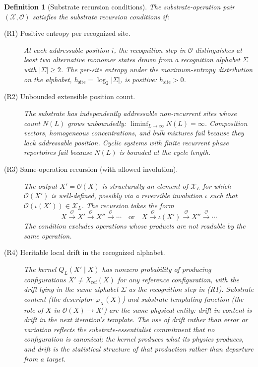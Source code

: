 \documentclass[aps,prx,reprint,amsmath,amssymb,floatfix,superscriptaddress,nofootinbib]{revtex4-2}
\theoremstyle{plain-thm}
\theoremstyle{definition-thm}
\newtheorem{definition}[theorem]{Definition}
\newcommand{\descX}{\varphi_X}
\newcommand{\Xset}{\mathcal{X}}
\newcommand{\Op}{\mathcal{O}}
\begin{document}
\begin{definition}[Substrate recursion conditions]
\label{def:conditions}
The substrate-operation pair $(\Xset, \Op)$ satisfies the substrate recursion conditions if:

\begin{description}
\item[(R1) Positive entropy per recognized site.] At each addressable position $i$, the recognition step in $\Op$ distinguishes at least two alternative monomer states drawn from a recognition alphabet $\Sigma$ with $|\Sigma| \ge 2$. The per-site entropy under the maximum-entropy distribution on the alphabet, $h_{\mathrm{site}} = \log_2 |\Sigma|$, is positive: $h_{\mathrm{site}} > 0$.

\item[(R2) Unbounded extensible position count.] The substrate has independently addressable non-recurrent sites whose count $N(L)$ grows unboundedly: $\liminf_{L \to \infty} N(L) = \infty$. Composition vectors, homogeneous concentrations, and bulk mixtures fail because they lack addressable position. Cyclic systems with finite recurrent phase repertoires fail because $N(L)$ is bounded at the cycle length.

\item[(R3) Same-operation recursion (with allowed involution).] The output $X' = \Op(X)$ is structurally an element of $\Xset_L$ for which $\Op(X')$ is well-defined, possibly via a reversible involution $\iota$ such that $\Op(\iota(X')) \in \Xset_L$. The recursion takes the form
\[
X \xrightarrow{\Op} X' \xrightarrow{\Op} X'' \xrightarrow{\Op} \cdots \quad \text{or} \quad X \xrightarrow{\Op} \iota(X') \xrightarrow{\Op} X'' \xrightarrow{\Op} \cdots
\]
The condition excludes operations whose products are not readable by the same operation.

\item[(R4) Heritable local drift in the recognized alphabet.] The kernel $Q_L(X' \mid X)$ has nonzero probability of producing configurations $X' \neq X_{\mathrm{ref}}(X)$ for any reference configuration, with the drift lying in the same alphabet $\Sigma$ as the recognition step in (R1). Substrate content (the descriptor $\descX(X)$) and substrate templating function (the role of $X$ in $\Op(X) \to X'$) are the same physical entity: drift in content is drift in the next iteration's template. The use of \emph{drift} rather than \emph{error} or \emph{variation} reflects the substrate-essentialist commitment that no configuration is canonical; the kernel produces what its physics produces, and drift is the statistical structure of that production rather than departure from a target.


\end{description}
\end{definition}
\end{document}
